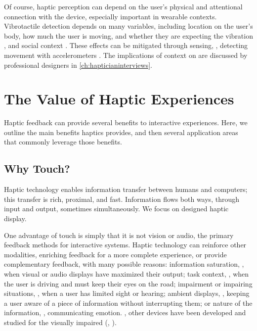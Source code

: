 

Of course, haptic perception can depend on the user's physical and attentional connection with the device, especially important in wearable contexts.
Vibrotactile detection depends on many variables, including location on the user's body, how much the user is moving, and whether they are expecting the vibration \cite{Karuei2011}, and social context \cite{Cauchard2016}.
These effects can be mitigated through sensing, \eg, detecting movement with accelerometers \cite{Blum2015}.
The implications of context on \haxd are discussed by professional designers in \autoref{ch:hapticianinterviews}.




%

%
%
\section{The Value of Haptic Experiences}
Haptic feedback can provide several benefits to interactive experiences.
Here, we outline the main benefits haptics provides, and then several application areas that commonly leverage those benefits.


\subsection{Why Touch?}
Haptic technology enables information transfer between humans and computers;
this transfer is rich, proximal, and fast.
Information flows both ways, through input and output, sometimes simultaneously.
We focus on designed haptic display.

One advantage of touch is simply that it is not vision or audio, the primary feedback methods for interactive systems.
Haptic technology can reinforce other modalities, enriching feedback for a more complete experience, or
provide complementary feedback, with many possible reasons:
information saturation, \eg, when visual or audio displays have maximized their output;
task context, \eg, when the user is driving and must keep their eyes on the road;
impairment or impairing situations, \eg, when a user has limited sight or hearing;
ambient displays, \eg, keeping a user aware of a piece of information without interrupting them;
or nature of the information, \eg, communicating emotion.
 \cite{Bach-y-Rita1969}, 
 other devices have been developed and studied for the visually impaired (\eg, \cite{Prescher2010,Bliss1970}).

